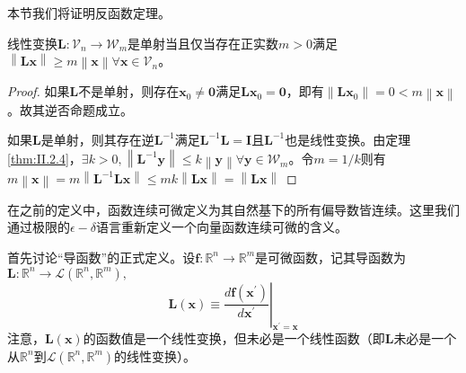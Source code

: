 \documentclass[main.tex]{subfiles}
\begin{document}
本节我们将证明反函数定理。
\begin{lemma}\label{thm:inv_func_l1}
线性变换$\mathbf{L}:\mathcal{V}_n\rightarrow\mathcal{W}_m$是单射当且仅当存在正实数$m>0$满足$\left\|\mathbf{Lx}\right\|\geq m \left\|\mathbf{x}\right\|\forall\mathbf{x}\in\mathcal{V}_n$。
\end{lemma}
\begin{proof}
如果$\mathbf{L}$不是单射，则存在$\mathbf{x}_0\neq\mathbf{0}$满足$\mathbf{Lx}_0=\mathbf{0}$，即有$\left\|\mathbf{Lx}_0\right\|=0<m\left\|\mathbf{x}\right\|$。故其逆否命题成立。

如果$\mathbf{L}$是单射，则其存在逆$\mathbf{L}^{-1}$满足$\mathbf{L}^{-1}\mathbf{L}=\mathbf{I}$且$\mathbf{L}^{-1}$也是线性变换。由定理\ref{thm:II.2.4}，$\exists k>0, \left\|\mathbf{L}^{-1}\mathbf{y}\right\|\leq k\left\|\mathbf{y}\right\|\forall\mathbf{y}\in\mathcal{W}_m$。令$m=1/k$则有$m\left\|\mathbf{x}\right\|=m\left\|\mathbf{L}^{-1}\mathbf{Lx}\right\|\leq mk\left\|\mathbf{Lx}\right\|=\left\|\mathbf{Lx}\right\|$
\end{proof}

在之前的定义中，函数连续可微定义为其自然基下的所有偏导数皆连续。这里我们通过极限的$\epsilon-\delta$语言重新定义一个向量函数连续可微的含义。

首先讨论“导函数”的正式定义。设$\mathbf{f}:\mathbb{R}^n\rightarrow\mathbb{R}^m$是可微函数，记其导函数为$\mathbf{L}:\mathbb{R}^n\rightarrow\mathcal{L}\left(\mathbb{R}^n,\mathbb{R}^m\right),$
\[
\mathbf{L}\left(\mathbf{x}\right)\equiv\left.\frac{d\mathbf{f}\left(\mathbf{x}^\prime\right)}{d\mathbf{x}^\prime}\right|_{\mathbf{x^\prime}=\mathbf{x}}
\]
注意，$\mathbf{L}\left(\mathbf{x}\right)$的函数值是一个线性变换，但未必是一个线性函数（即$\mathbf{L}$未必是一个从$\mathbb{R}^n$到$\mathcal{L}\left(\mathbb{R}^n,\mathbb{R}^m\right)$的线性变换）。
\end{document}
